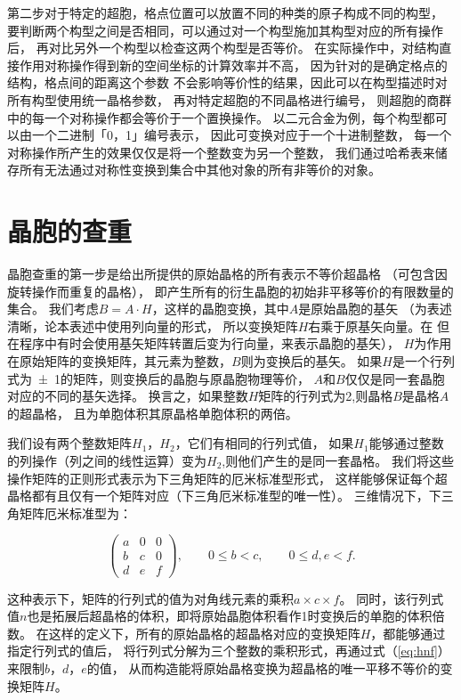第二步对于特定的超胞，格点位置可以放置不同的种类的原子构成不同的构型，
要判断两个构型之间是否相同，可以通过对一个构型施加其构型对应的所有操作后，
再对比另外一个构型以检查这两个构型是否等价。
在实际操作中，对结构直接作用对称操作得到新的空间坐标的计算效率并不高，
因为针对的是确定格点的结构，格点间的距离这个参数
不会影响等价性的结果，因此可以在构型描述时对所有构型使用统一晶格参数，
再对特定超胞的不同晶格进行编号，
则超胞的商群中的每一个对称操作都会等价于一个置换操作。
以二元合金为例，每个构型都可以由一个二进制「0，1」编号表示，
因此可变换对应于一个十进制整数，
每一个对称操作所产生的效果仅仅是将一个整数变为另一个整数，
我们通过哈希表来储存所有无法通过对称性变换到集合中其他对象的所有非等价的对象。

\section{晶胞的查重}
晶胞查重的第一步是给出所提供的原始晶格的所有表示不等价超晶格
（可包含因旋转操作而重复的晶格），
即产生所有的衍生晶胞的初始非平移等价的有限数量的集合。
我们考虑$B=A\cdot H$，这样的晶胞变换，其中$A$是原始晶胞的基矢
（为表述清晰，论本表述中使用列向量的形式，
所以变换矩阵$H$右乘于原基矢向量。在
但在程序中有时会使用基矢矩阵转置后变为行向量，来表示晶胞的基矢），
$H$为作用在原始矩阵的变换矩阵，其元素为整数，$B$则为变换后的基矢。
如果$H$是一个行列式为\num{+-1}的矩阵，则变换后的晶胞与原晶胞物理等价，
$A$和$B$仅仅是同一套晶胞对应的不同的基矢选择。
换言之，如果整数$H$矩阵的行列式为\num{2},则晶格$B$是晶格$A$的超晶格，
且为单胞体积其原晶格单胞体积的两倍。

我们设有两个整数矩阵$H_1$，$H_2$，它们有相同的行列式值，
如果$H_1$能够通过整数的列操作（列之间的线性运算）变为$H_2$,则他们产生的是同一套晶格。
我们将这些操作矩阵的正则形式表示为下三角矩阵的厄米标准型形式，
这样能够保证每个超晶格都有且仅有一个矩阵对应（下三角厄米标准型的唯一性\cite{santoro1973coincidence}）。
三维情况下，下三角矩阵厄米标准型为：

\begin{equation}\label{eq:hnf}
  \begin{pmatrix}
    a & 0 & 0 \\
    b & c & 0 \\
    d & e & f
  \end{pmatrix}, \qquad
  0\leq b < c, \qquad
  0\leq d, e< f.
\end{equation}

这种表示下，矩阵的行列式的值为对角线元素的乘积$a\times c \times f$。
同时，该行列式值$n$也是拓展后超晶格的体积，即将原始晶胞体积看作\num{1}时变换后的单胞的体积倍数。
在这样的定义下，所有的原始晶格的超晶格对应的变换矩阵$H$，都能够通过指定行列式的值后，
将行列式分解为三个整数的乘积形式，再通过式（\ref{eq:hnf}）来限制$b$，$d$，$e$的值，
从而构造能将原始晶格变换为超晶格的唯一平移不等价的变换矩阵$H$。

